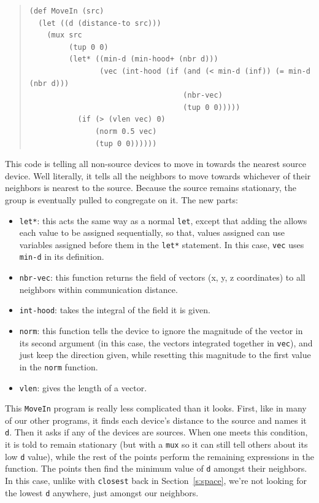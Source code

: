 \documentclass{article}
\newcommand\var[1]{{\tt #1}}
\begin{document}
\begin{quote}
\begin{verbatim}
(def MoveIn (src)
  (let ((d (distance-to src)))
    (mux src
         (tup 0 0)
         (let* ((min-d (min-hood+ (nbr d)))
                (vec (int-hood (if (and (< min-d (inf)) (= min-d (nbr d)))
                                   (nbr-vec)
                                   (tup 0 0)))))
           (if (> (vlen vec) 0)
               (norm 0.5 vec) 
               (tup 0 0))))))
\end{verbatim}
\end{quote}

This code is telling all non-source devices to move in towards the
nearest source device.  Well literally, it tells all the neighbors to
move towards whichever of their neighbors is nearest to the source.
Because the source remains stationary, the group is eventually pulled
to congregate on it.  The new parts:
\begin{itemize}
\item \var{let*}: this acts the same way as a normal \var{let}, except
  that adding the \var{*} allows each value to be assigned
  sequentially, so that, values assigned can use variables assigned
  before them in the \var{let*} statement.  In this case, \var{vec}
  uses \var{min-d} in its definition.
\item \var{nbr-vec}: this function returns the field of vectors (x, y,
  z coordinates) to all neighbors within communication distance.
\item \var{int-hood}: takes the integral of the field it is given.
\item \var{norm}: this function tells the device to ignore the
  magnitude of the vector in its second argument (in this case, the
  vectors integrated together in \var{vec}), and just keep the
  direction given, while resetting this magnitude to the first value
  in the \var{norm} function.
\item \var{vlen}: gives the length of a vector.
\end{itemize}

This \var{MoveIn} program is really less complicated than it looks.
First, like in many of our other programs, it finds each device's
distance to the source and names it \var{d}.  Then it asks if any of
the devices are sources.  When one meets this condition, it is told to
remain stationary (but with a \var{mux} so it can still tell others
about its low \var{d} value), while the rest of the points perform the
remaining expressions in the function.  The points then find the
minimum value of \var{d} amongst their neighbors.  In this case,
unlike with \var{closest} back in Section~\ref{s:space}, we're not
looking for the lowest \var{d} anywhere, just amongst our neighbors.
\end{document}
